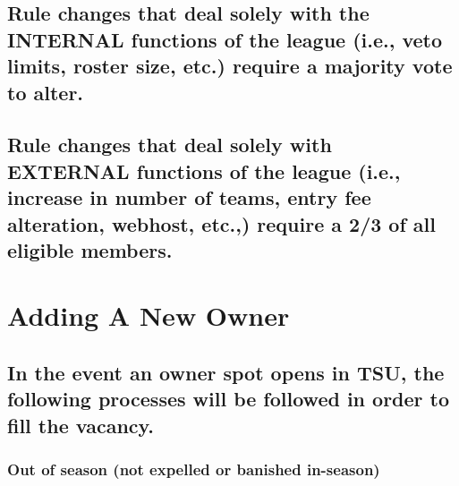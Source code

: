 \documentclass[
]{book}
\begin{document}
\hypertarget{rule-changes-that-deal-solely-with-the-internal-functions-of-the-league-i.e.-veto-limits-roster-size-etc.-require-a-majority-vote-to-alter.}{%
\subsection{Rule changes that deal solely with the INTERNAL functions of the league (i.e., veto limits, roster size, etc.) require a majority vote to alter.}\label{rule-changes-that-deal-solely-with-the-internal-functions-of-the-league-i.e.-veto-limits-roster-size-etc.-require-a-majority-vote-to-alter.}}

\hypertarget{rule-changes-that-deal-solely-with-external-functions-of-the-league-i.e.-increase-in-number-of-teams-entry-fee-alteration-webhost-etc.-require-a-23-of-all-eligible-members.}{%
\subsection{Rule changes that deal solely with EXTERNAL functions of the league (i.e., increase in number of teams, entry fee alteration, webhost, etc.,) require a 2/3 of all eligible members.}\label{rule-changes-that-deal-solely-with-external-functions-of-the-league-i.e.-increase-in-number-of-teams-entry-fee-alteration-webhost-etc.-require-a-23-of-all-eligible-members.}}

\hypertarget{adding-a-new-owner}{%
\section{Adding A New Owner}\label{adding-a-new-owner}}

\hypertarget{in-the-event-an-owner-spot-opens-in-tsu-the-following-processes-will-be-followed-in-order-to-fill-the-vacancy.}{%
\subsection{In the event an owner spot opens in TSU, the following processes will be followed in order to fill the vacancy.}\label{in-the-event-an-owner-spot-opens-in-tsu-the-following-processes-will-be-followed-in-order-to-fill-the-vacancy.}}

\hypertarget{out-of-season-not-expelled-or-banished-in-season}{%
\subsubsection{Out of season (not expelled or banished in-season)}\label{out-of-season-not-expelled-or-banished-in-season}}
\end{document}
